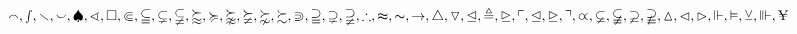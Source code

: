 $
      \smallfrown,
      \smallint,
      \smallsetminus,
      \smallsmile,
      \spadesuit,
      \sphericalangle,
      \square,
      \Subset,
      \subseteqq,
      \subsetneq,
      \subsetneqq,
      \succapprox,
      \succcurlyeq,
      \succnapprox,
      \succneqq,
      \succnsim,
      \succsim,
      \Supset,
      \supseteqq,
      \supsetneq,
      \supsetneqq,
      \therefore,
      \thickapprox,
      \thicksim,
      \to,
      \triangle,
      \triangledown,
      \trianglelefteq,
      \triangleq,
      \trianglerighteq,
      \ulcorner,
      \unlhd,
      \unrhd,
      \urcorner,
      \varpropto,
      \varsubsetneq,
      \varsubsetneqq,
      \varsupsetneq,
      \varsupsetneqq,
      \vartriangle,
      \vartriangleleft,
      \vartriangleright,
      \Vdash,
      \vDash,
      \veebar,
      \Vvdash,
      \yen
$